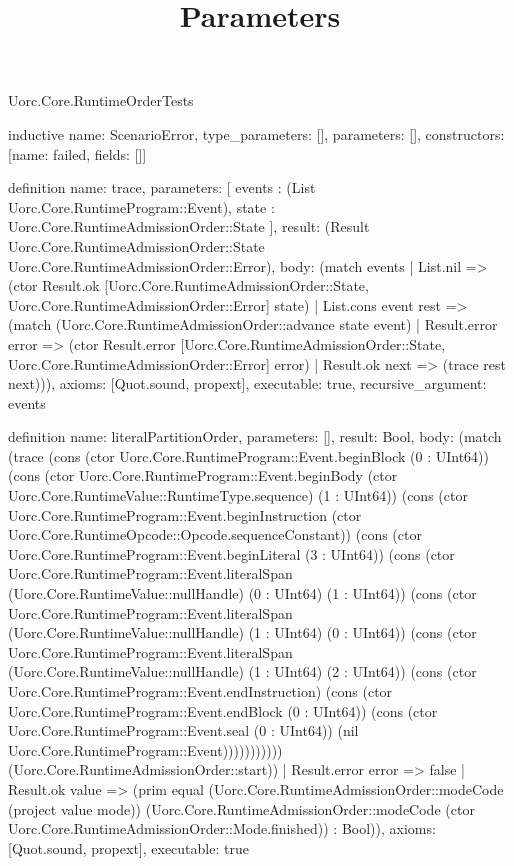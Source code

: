 \begin{lexlean}{Uorc.Core.RuntimeOrderTests}
\title{Parameters}
\begin{semanticmodule}
inductive{
  name: ScenarioError,
  type_parameters: [],
  parameters: [],
  constructors: [{name: failed, fields: []}]
}

definition{
  name: trace,
  parameters: [
    events : (List Uorc.Core.RuntimeProgram::Event),
    state : Uorc.Core.RuntimeAdmissionOrder::State
  ],
  result: (Result Uorc.Core.RuntimeAdmissionOrder::State Uorc.Core.RuntimeAdmissionOrder::Error),
  body: (match events
    | List.nil => (ctor Result.ok [Uorc.Core.RuntimeAdmissionOrder::State, Uorc.Core.RuntimeAdmissionOrder::Error] state)
    | List.cons event rest => (match (Uorc.Core.RuntimeAdmissionOrder::advance state event)
      | Result.error error => (ctor Result.error [Uorc.Core.RuntimeAdmissionOrder::State, Uorc.Core.RuntimeAdmissionOrder::Error] error)
      | Result.ok next => (trace rest next))),
  axioms: [Quot.sound, propext],
  executable: true,
  recursive_argument: events
}

definition{
  name: literalPartitionOrder,
  parameters: [],
  result: Bool,
  body: (match (trace (cons (ctor Uorc.Core.RuntimeProgram::Event.beginBlock (0 : UInt64)) (cons (ctor Uorc.Core.RuntimeProgram::Event.beginBody (ctor Uorc.Core.RuntimeValue::RuntimeType.sequence) (1 : UInt64)) (cons (ctor Uorc.Core.RuntimeProgram::Event.beginInstruction (ctor Uorc.Core.RuntimeOpcode::Opcode.sequenceConstant)) (cons (ctor Uorc.Core.RuntimeProgram::Event.beginLiteral (3 : UInt64)) (cons (ctor Uorc.Core.RuntimeProgram::Event.literalSpan (Uorc.Core.RuntimeValue::nullHandle) (0 : UInt64) (1 : UInt64)) (cons (ctor Uorc.Core.RuntimeProgram::Event.literalSpan (Uorc.Core.RuntimeValue::nullHandle) (1 : UInt64) (0 : UInt64)) (cons (ctor Uorc.Core.RuntimeProgram::Event.literalSpan (Uorc.Core.RuntimeValue::nullHandle) (1 : UInt64) (2 : UInt64)) (cons (ctor Uorc.Core.RuntimeProgram::Event.endInstruction) (cons (ctor Uorc.Core.RuntimeProgram::Event.endBlock (0 : UInt64)) (cons (ctor Uorc.Core.RuntimeProgram::Event.seal (0 : UInt64)) (nil Uorc.Core.RuntimeProgram::Event))))))))))) (Uorc.Core.RuntimeAdmissionOrder::start))
    | Result.error error => false
    | Result.ok value => (prim equal (Uorc.Core.RuntimeAdmissionOrder::modeCode (project value mode)) (Uorc.Core.RuntimeAdmissionOrder::modeCode (ctor Uorc.Core.RuntimeAdmissionOrder::Mode.finished)) : Bool)),
  axioms: [Quot.sound, propext],
  executable: true
}


\end{semanticmodule}
\end{lexlean}
